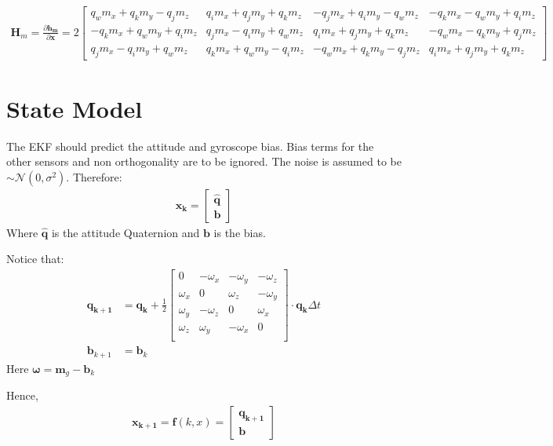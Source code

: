 \documentclass[10pt,a4paper]{article}
\newcommand{\M}[1]{\mathbf{#1}}
\newcommand{\V}[1]{\mathbf{#1}}
\newcommand{\Vh}[1]{\mathbf{\hat{#1}}}
\begin{document}
\begin{align}
  \M H_m =  \frac { \partial \V {h_m}}  {\partial \V x}  =
2 \begin{bmatrix}
q_w m_x + q_k m_y - q_j m_z & q_i m_x + q_j m_y + q_k m_z & -q_j m_x + q_i m_y - q_w m_z & -q_k m_x - q_w m_y + q_i m_z \\
-q_k m_x + q_w m_y + q_i m_z & q_j m_x - q_i m_y + q_w m_z & q_i m_x + q_j m_y + q_k m_z & -q_w m_x - q_k m_y + q_j m_z \\
q_j m_x - q_i m_y + q_w m_z & q_k m_x + q_w m_y - q_i m_z & -q_w m_x + q_k m_y - q_j m_z & q_i m_x + q_j m_y + q_k m_z
\end{bmatrix}
\end{align}

\section {State Model}
The EKF should predict the attitude and gyroscope bias.
Bias terms for the other sensors and non orthogonality are to be ignored.
The noise is assumed to be $\sim \mathcal{N}(0, \sigma^2)$.
Therefore: 
\begin{align}
  \V {x_k} =
  \begin{bmatrix}
    \Vh q \\ \V b
  \end{bmatrix}
\end{align}
Where $\Vh q$ is the attitude Quaternion and $\V b$ is the bias.

Notice that:
\begin{align}
  \V {q_{k+1}} &= \V{q_k} + \frac 1 2
                 \begin{bmatrix}
                                0 & - \omega_x  & - \omega_y  & - \omega_z  \\ 
                                \omega_x  &  0 &  \omega_z  &  -\omega_y  \\ 
                                \omega_y  &  -\omega_z  &  0 & \omega_x  \\ 
                                 \omega_z  &  \omega_y  &  -\omega_x  &  0 \\ 
                 \end{bmatrix} \cdot \V {q_k} \Delta t \\ 
  \V b_{k + 1} &= \V b_k
\end{align}
Here $\V \omega = \V m_g - \V b_k$

Hence, 
\begin{align}
  \V {x_{k+1}} = \V f (k, x) = 
  \begin{bmatrix}
    \V {q_{k+1}} \\ 
    \V b
  \end{bmatrix}
\end{align}
\end{document}
